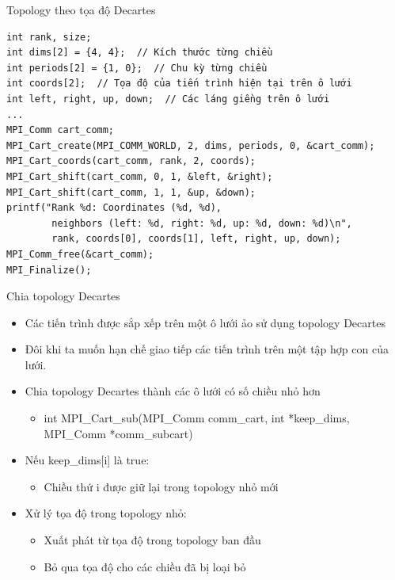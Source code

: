 \documentclass[10pt]{beamer}
\theoremstyle{remark}
\numberwithin{algocf}{section}
\numberwithin{equation}{section}
\numberwithin{dl}{section}
\numberwithin{figure}{section}
\begin{document}
\begin{frame}[fragile]{Topology theo tọa độ Decartes}
    \begin{verbatim}
int rank, size;
int dims[2] = {4, 4};  // Kích thước từng chiều
int periods[2] = {1, 0};  // Chu kỳ từng chiều
int coords[2];  // Tọa độ của tiến trình hiện tại trên ô lưới
int left, right, up, down;  // Các láng giềng trên ô lưới
...
MPI_Comm cart_comm;
MPI_Cart_create(MPI_COMM_WORLD, 2, dims, periods, 0, &cart_comm);
MPI_Cart_coords(cart_comm, rank, 2, coords);
MPI_Cart_shift(cart_comm, 0, 1, &left, &right);
MPI_Cart_shift(cart_comm, 1, 1, &up, &down); 
printf("Rank %d: Coordinates (%d, %d), 
        neighbors (left: %d, right: %d, up: %d, down: %d)\n",
        rank, coords[0], coords[1], left, right, up, down); 
MPI_Comm_free(&cart_comm);
MPI_Finalize();
    \end{verbatim}
\end{frame}

\begin{frame}{Chia topology Decartes}
    \begin{itemize}
        \item Các tiến trình được sắp xếp trên một ô lưới ảo sử dụng topology Decartes
        \item Đôi khi ta muốn hạn chế giao tiếp các tiến trình trên một tập hợp con của lưới.
        \item Chia topology Decartes thành các ô lưới có số chiều nhỏ hơn
        \begin{itemize}
            \item int MPI\_Cart\_sub(MPI\_Comm comm\_cart, int *keep\_dims,
                                     MPI\_Comm *comm\_subcart) 
        \end{itemize}
        \item Nếu keep\_dims[i] là true:
        \begin{itemize}
            \item Chiều thứ i được giữ lại trong topology nhỏ mới
        \end{itemize}
        \item Xử lý tọa độ trong topology nhỏ:
        \begin{itemize}
            \item Xuất phát từ tọa độ trong topology ban đầu
            \item Bỏ qua tọa độ cho các chiều đã bị loại bỏ
        \end{itemize}
    \end{itemize}
\end{frame}
\end{document}
